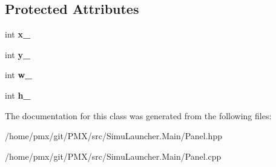 \subsection*{Protected Attributes}
\begin{DoxyCompactItemize}
\item 
\mbox{\label{classPanel_ac6c2c93150c73d4840e1190836ae0453}} 
int {\bfseries x\+\_\+}
\item 
\mbox{\label{classPanel_aca7fd07fdea3e9d7c00cc481380a0e96}} 
int {\bfseries y\+\_\+}
\item 
\mbox{\label{classPanel_a2bb71f8f0d09320eae0a24354a5aa928}} 
int {\bfseries w\+\_\+}
\item 
\mbox{\label{classPanel_ab27498c7373674a415dc32a0563d60f0}} 
int {\bfseries h\+\_\+}
\end{DoxyCompactItemize}


The documentation for this class was generated from the following files\+:\begin{DoxyCompactItemize}
\item 
/home/pmx/git/\+P\+M\+X/src/\+Simu\+Launcher.\+Main/Panel.\+hpp\item 
/home/pmx/git/\+P\+M\+X/src/\+Simu\+Launcher.\+Main/Panel.\+cpp\end{DoxyCompactItemize}
